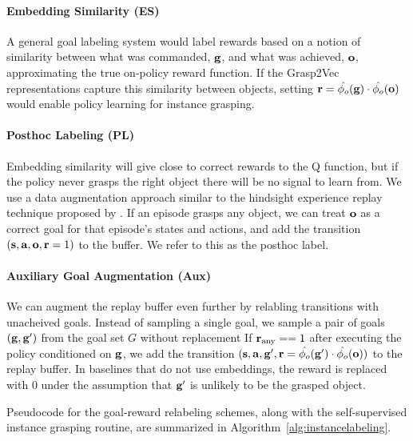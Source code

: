 \documentclass{article}
\begin{document}
\vspace{-0.1in}
\paragraph{Embedding Similarity (ES)}
A general goal labeling system would label rewards based on a notion of similarity between what was commanded, $\mathbf{g}$, and what was achieved, $\mathbf{o}$, approximating the true on-policy reward function. If the Grasp2Vec representations capture this similarity between objects, setting $\mathbf{r} = \hat{\phi_o}(\mathbf{g}) \cdot \hat{\phi_o}(\mathbf{o})$ would enable policy learning for instance grasping.

\vspace{-0.1in}
\paragraph{Posthoc Labeling (PL)}
\label{methods:posthoc}
Embedding similarity will give close to correct rewards to the Q function, but if the policy never grasps the right object there
will be no signal to learn from. We use a data augmentation approach similar to the hindsight experience replay technique proposed by \citet{hindsight2017}.
If an episode grasps any object, we can treat $\mathbf{o}$ as a correct goal for that episode's states and actions, and add the transition \((\mathbf{s}, \mathbf{a}, \mathbf{o}, \mathbf{r}=1)\) to the buffer. We refer to this as the posthoc label.

\vspace{-0.1in}
\paragraph{Auxiliary Goal Augmentation (Aux)}
We can augment the replay buffer even further by relabling transitions with unacheived goals. Instead of sampling
a single goal, we sample a pair of goals \( (\mathbf{g}, \mathbf{g^\prime}) \) from the goal set $G$ without replacement
If \(\mathbf{r}_\text{any}==1\) after executing the policy conditioned on $\mathbf{g}$, we add the transition \((\mathbf{s}, \mathbf{a}, \mathbf{g^\prime}, \mathbf{r}=\hat{\phi_o}(\mathbf{g^\prime}) \cdot \hat{\phi_o}(\mathbf{o}))\) to the replay buffer. In baselines
that do not use embeddings, the reward is replaced with 0 under the assumption that $\mathbf{g^\prime}$ is unlikely
to be the grasped object.

Pseudocode for the goal-reward relabeling schemes, along with the self-supervised instance grasping routine, are summarized in Algorithm~\ref{alg:instancelabeling}.
\end{document}
